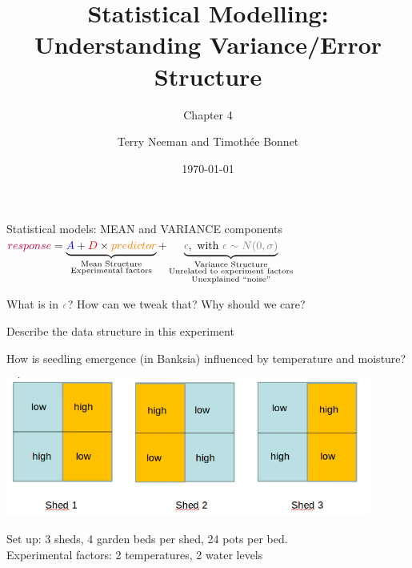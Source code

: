 \documentclass[10pt]{beamer}
\title{Statistical Modelling: Understanding Variance/Error Structure}
\subtitle{Chapter 4}
\author{Terry Neeman and Timoth\'ee Bonnet}
\date{\today}
\begin{document}



\begin{frame}{}
\maketitle

\end{frame}

\begin{frame}{Statistical models: MEAN and VARIANCE components}
\centering
  ${\color{purple}{response}} = \underbrace{{\color{blue}{A}} + {\color{red}{D}} \times {\color{orange}{predictor}}}_{\substack{\text{Mean Structure} \\ \text{Experimental factors}}} + 
  \underbrace{{\color{gray}{\epsilon}}, \text{ with } {\color{gray}{\epsilon \sim N(0,\sigma)}}}_{\substack{\text{Variance Structure} \\ \text{Unrelated to experiment factors} \\ \text{Unexplained ``noise''}}}$

  \pause 
  \vfill
  
  What is in ${\color{gray}{\epsilon}}$? How can we tweak that? Why should we care?
  \end{frame}

\begin{frame}{Describe the data structure in this experiment}
 
 How is seedling emergence (in Banksia) influenced by temperature and moisture?
 
 \includegraphics[width=0.9\textwidth]{Figures/banksiashed}


Set up: 3 sheds, 4 garden beds per shed, 24 pots per bed.\\
Experimental factors:  2 temperatures, 2 water levels

\end{frame}
\end{document}
